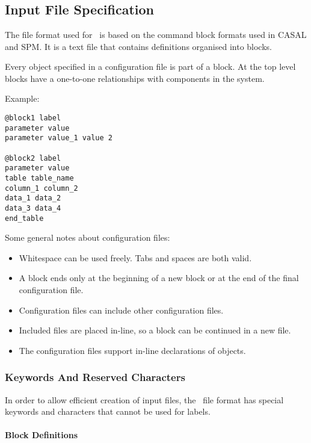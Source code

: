 
\section{\label{sec:examples}}

\subsection{Input File Specification}

The file format used for \CNAME\ is based on the command block formats used in CASAL and SPM. It is a text file that contains definitions organised into blocks.

Every object specified in a configuration file is part of a block. At the top level blocks have a one-to-one relationships with components in the system.

Example:

{\small{\begin{verbatim}
@block1 label
parameter value
parameter value_1 value 2

@block2 label
parameter value
table table_name
column_1 column_2
data_1 data_2
data_3 data_4
end_table
\end{verbatim}}}

Some general notes about configuration files:

\begin{itemize}
	\item Whitespace can be used freely. Tabs and spaces are both valid.
	\item A block ends only at the beginning of a new block or at the end of the final configuration file.
	\item Configuration files can include other configuration files.
	\item Included files are placed in-line, so a block can be continued in a new file.
	\item The configuration files support in-line declarations of objects.
\end{itemize}

\subsubsection{Keywords And Reserved Characters}

In order to allow efficient creation of input files, the \CNAME\ file format has special keywords and characters that cannot be used for labels.

\paragraph*{\command Block Definitions}

